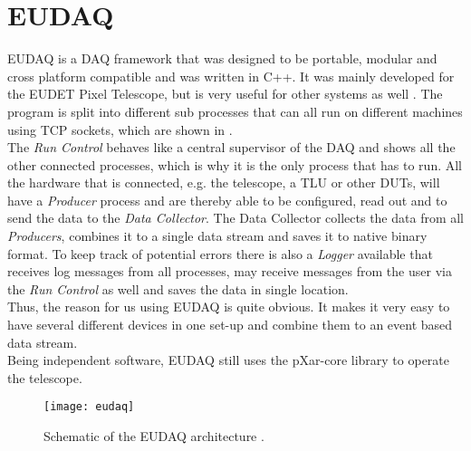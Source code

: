 \section{EUDAQ}
EUDAQ is a \ac{DAQ} framework that was designed to be portable, modular and cross platform compatible and was written in C++. It was mainly developed for the EUDET Pixel Telescope, but is very useful for other systems as well \cite{eudaq}. The program is split into different sub processes that can all run on different machines using \ac{TCP} sockets, which are shown in .\\
The \textit{Run Control} behaves like a central supervisor of the \ac{DAQ} and shows all the other connected processes, which is why it is the only process that has to run. All the hardware that is connected, e.g. the telescope, a \ac{TLU} or other \ac{DUT}s, will have a \textit{Producer} process and are thereby able to be configured, read out and to send the data to the \textit{Data Collector}. The Data Collector collects the data from all \textit{Producers}, combines it to a single data stream and saves it to native binary format. To keep track of potential errors there is also a \textit{Logger} available that receives log messages from all processes, may receive messages from the user via the \textit{Run Control} as well and saves the data in single location.\\
Thus, the reason for us using EUDAQ is quite obvious. It makes it very easy to have several different devices in one set-up and combine them to an event based data stream. \\
Being independent software, EUDAQ still uses the pXar-core library to operate the telescope.
\begin{figure}[ht]
	\texttt{[image: eudaq]}
	\caption{Schematic of the EUDAQ architecture \cite{eudaq}.}
	\label{p16}
\end{figure}
